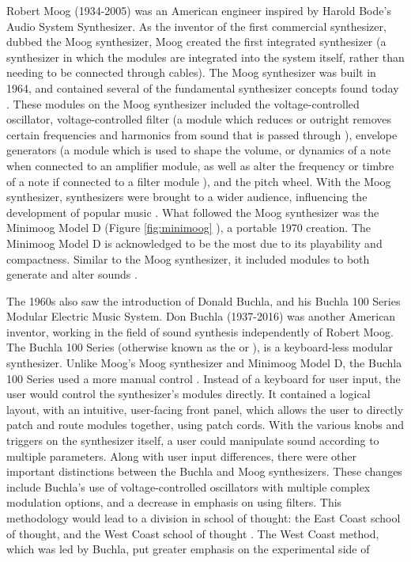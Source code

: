 Robert Moog (1934-2005) was an American engineer inspired by Harold Bode's Audio System Synthesizer. As the inventor of the first commercial synthesizer, dubbed the Moog synthesizer, Moog created the first integrated synthesizer (a synthesizer in which the modules are integrated into the system itself, rather than needing to be connected through cables). The Moog synthesizer was built in 1964, and contained several of the fundamental synthesizer concepts found today \cite{Pinch_Trocco_2004}. These modules on the Moog synthesizer included the voltage-controlled oscillator, voltage-controlled filter (a module which reduces or outright removes certain frequencies and harmonics from sound that is passed through \cite{Meyer_2016}), envelope generators (a module which is used to shape the volume, or dynamics of a note when connected to an amplifier module, as well as alter the frequency or timbre of a note if connected to a filter module \cite{Meyer_2016}), and the pitch wheel. With the Moog synthesizer, synthesizers were brought to a wider audience, influencing the development of popular music \cite{Pinch_Trocco_2004}. What followed the Moog synthesizer was the Minimoog Model D (Figure \ref{fig:minimoog} \cite{Krash_2005}), a portable 1970 creation. The Minimoog Model D is acknowledged to be the most  \cite{Gabrielli_2020} due to its playability and compactness. Similar to the Moog synthesizer, it included modules to both generate and alter sounds \cite{Pinch_Trocco_2002}.

The 1960s also saw the introduction of Donald  Buchla, and his Buchla 100 Series Modular Electric Music System. Don Buchla (1937-2016) was another American inventor, working in the field of sound synthesis independently of Robert Moog. The Buchla 100 Series (otherwise known as the  or ), is a keyboard-less modular synthesizer. Unlike Moog's Moog synthesizer and Minimoog Model D, the Buchla 100 Series used a more manual control \cite{Pinch_Trocco_1998}. Instead of a keyboard for user input, the user would control the synthesizer's modules directly. It contained a logical layout, with an intuitive, user-facing front panel, which allows the user to directly patch and route modules together, using patch cords. With the various knobs and triggers on the synthesizer itself, a user could manipulate sound according to multiple parameters. Along with user input differences, there were other important distinctions between the Buchla and Moog synthesizers. These changes include Buchla's use of voltage-controlled oscillators with multiple complex modulation options, and a decrease in emphasis on using filters. This methodology would lead to a division in school of thought: the East Coast school of thought, and the West Coast school of thought \cite{Gabrielli_2020}. The West Coast method, which was led by Buchla, put greater emphasis on the experimental side of electronic music, and so designed their synthesizers according to this.

